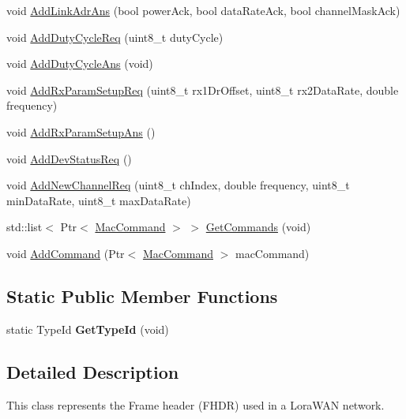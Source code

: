 \begin{DoxyCompactItemize}
void \hyperlink{classns3_1_1lorawan_1_1LoraFrameHeader_abf2caf5f060666e1e896e698ac783232}{Add\+Link\+Adr\+Ans} (bool power\+Ack, bool data\+Rate\+Ack, bool channel\+Mask\+Ack)
\item 
void \hyperlink{classns3_1_1lorawan_1_1LoraFrameHeader_a09b2408b1481fe4d4ca84e6f977c19d7}{Add\+Duty\+Cycle\+Req} (uint8\+\_\+t duty\+Cycle)
\item 
void \hyperlink{classns3_1_1lorawan_1_1LoraFrameHeader_ade22e8653e98a0ceeada027f16a41fa7}{Add\+Duty\+Cycle\+Ans} (void)
\item 
void \hyperlink{classns3_1_1lorawan_1_1LoraFrameHeader_af7aef278503cd2e152b36c9abaf2ed63}{Add\+Rx\+Param\+Setup\+Req} (uint8\+\_\+t rx1\+Dr\+Offset, uint8\+\_\+t rx2\+Data\+Rate, double frequency)
\item 
void \hyperlink{classns3_1_1lorawan_1_1LoraFrameHeader_a455c58eda429169dffe119433cb8d70b}{Add\+Rx\+Param\+Setup\+Ans} ()
\item 
void \hyperlink{classns3_1_1lorawan_1_1LoraFrameHeader_a567bccb9daf4936cb13c70f245e563bd}{Add\+Dev\+Status\+Req} ()
\item 
void \hyperlink{classns3_1_1lorawan_1_1LoraFrameHeader_a30b475f8cbb1151fbe0369ffc5ee6441}{Add\+New\+Channel\+Req} (uint8\+\_\+t ch\+Index, double frequency, uint8\+\_\+t min\+Data\+Rate, uint8\+\_\+t max\+Data\+Rate)
\item 
std\+::list$<$ Ptr$<$ \hyperlink{classns3_1_1lorawan_1_1MacCommand}{Mac\+Command} $>$ $>$ \hyperlink{classns3_1_1lorawan_1_1LoraFrameHeader_a8cabc618a1b97c66e06d6058f038887d}{Get\+Commands} (void)
\item 
void \hyperlink{classns3_1_1lorawan_1_1LoraFrameHeader_a238abef9aa4e39c628e395485abb89b8}{Add\+Command} (Ptr$<$ \hyperlink{classns3_1_1lorawan_1_1MacCommand}{Mac\+Command} $>$ mac\+Command)
\end{DoxyCompactItemize}
\subsection*{Static Public Member Functions}
\begin{DoxyCompactItemize}
\item 
\mbox{\label{classns3_1_1lorawan_1_1LoraFrameHeader_a5a61dedc573c98255e53d8f0e091be5d}} 
static Type\+Id {\bfseries Get\+Type\+Id} (void)
\end{DoxyCompactItemize}


\subsection{Detailed Description}
This class represents the Frame header (F\+H\+DR) used in a Lora\+W\+AN network.

